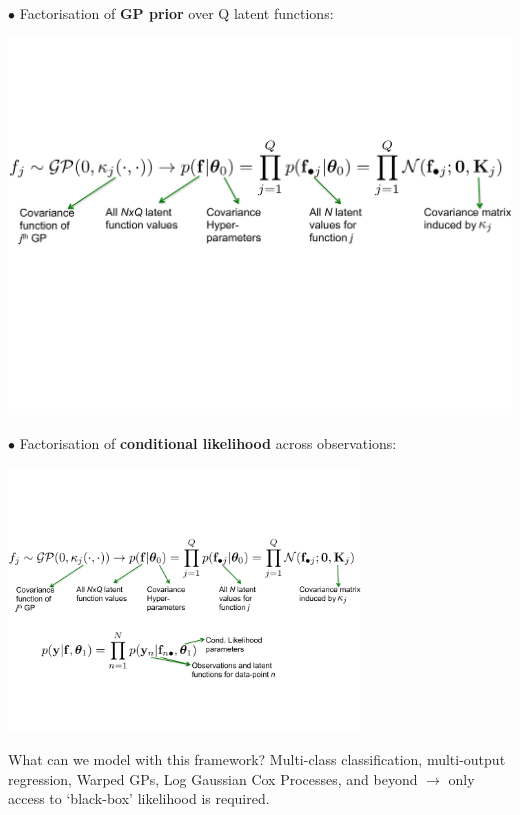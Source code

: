 \documentclass[landscape,a0paper,fontscale=0.292]{baposter}
\newcommand{\red}[1]{{\color{red}#1}}
\newcommand{\insertline}{\vspace{2mm}}
\begin{document}
\begin{poster}
{\insertline
{$\bullet$ Factorisation of \textbf{GP prior} over Q latent functions:}
\vspace{-0.2cm}
\begin{center}
	\includegraphics[width=\textwidth]{prior}
\end{center}
\vspace{-0.2cm}
{$\bullet$ Factorisation of \textbf{conditional likelihood} across observations:}
\vspace{-0.2cm}
\begin{center}
	\includegraphics[width=0.7\textwidth]{likelihood}
\end{center}
\vspace{-0.2cm}
\red{What can we model with this framework?} Multi-class classification,
multi-output regression, Warped GPs, Log Gaussian Cox Processes, and beyond
$\rightarrow$ only access to `black-box' likelihood is required.
}


\end{poster}
\end{document}
